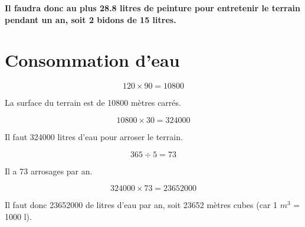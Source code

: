\documentclass[12pt,a4paper]{article}
\begin{document}
\textbf{Il faudra donc au plus \num{28.8} litres de peinture pour entretenir le terrain pendant un an, soit 2 bidons de 15 litres.
}

\section{Consommation d'eau}

\begin{equation*}
	120 \times 90 = \num{10800}
\end{equation*}

La surface du terrain est de \num{10800} mètres carrés.


\begin{equation*}
	\num{10800} \times 30 = \num{324000}
\end{equation*}

Il faut \num{324000} litres d'eau pour arroser le terrain.

\begin{equation*}
	365 \div 5 = 73
\end{equation*}

Il a 73 arrosages par an.

\begin{equation*}
	\num{324000} \times 73 = \num{23652000}
\end{equation*}

Il faut donc \num{23652000} de litres d'eau par an, soit \num{23652} mètres cubes (car 1 $m^3$ = 1000 l).
\end{document}
